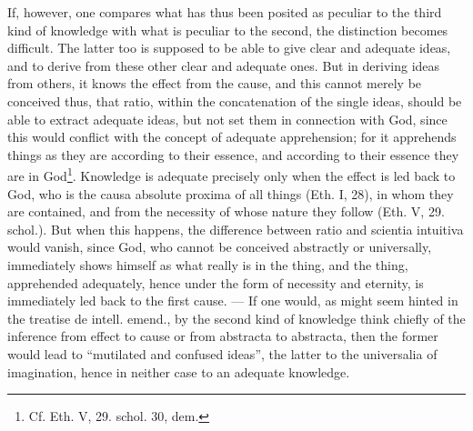 \documentclass[12pt,a4paper,openany]{book}
\newcommand{\opage}[1]{\marginnote{\footnotesize\textit{[#1]}}}
\begin{document}
\opage{103}\setcounter{footnote}{0}If, however, one compares what has thus been posited as
peculiar to the third kind of knowledge with what is
peculiar to the second, the distinction becomes difficult. The latter too
is supposed to be able to give clear and adequate ideas, and to derive from these
other clear and adequate ones. But in deriving ideas from others,
it knows the effect from the cause, and this cannot merely
be conceived thus, that ratio, within the concatenation of the single ideas,
should be able to extract adequate ideas, but not set
them in connection with God, since this would conflict with the concept of
adequate apprehension; for it apprehends things as they are according to their
essence, and according to their essence they are in God\footnote{Cf. Eth. V, 29.
schol. 30, dem.}. Knowledge is adequate precisely only when the effect
is led back to God, who is the causa absolute proxima of all things
(Eth. I, 28), in whom they are contained, and from the necessity of whose nature
they follow (Eth. V, 29. schol.). But when this happens, the
difference between ratio and scientia intuitiva would vanish, since God,
who cannot be conceived abstractly or universally, immediately shows
himself as what really is in the thing, and the thing, apprehended adequately,
hence under the form of necessity and eternity, is immediately led
back to the first cause. --- If one would, as might seem
hinted in the treatise de intell. emend., by the second
kind of knowledge think chiefly of the inference from effect to
cause or from abstracta to abstracta, then the former would lead
to ``mutilated and confused ideas'', the latter to the universalia
of imagination, hence in neither case to an adequate
knowledge.
\end{document}
